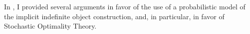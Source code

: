 In , I provided several arguments in favor of the use of a probabilistic model of the implicit indefinite object construction, and, in particular, in favor of Stochastic Optimality Theory. 







